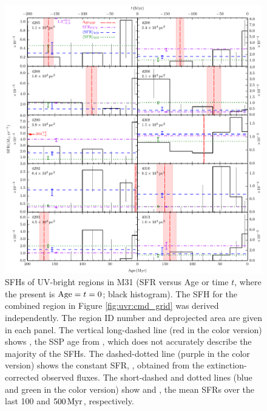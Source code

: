\begin{figure}
\centering
\includegraphics[width=\textwidth]{uv_regions-figures/sfh_grid-4285-4313.pdf}
\caption[SFHs of UV-bright regions in M31.]{SFHs of UV-bright regions in M31 (SFR versus Age or time $t$, where
    the present is $\mathrm{Age} = t = 0$; black histogram). The SFH for the
    combined region in Figure \ref{fig:uvr:cmd_grid} was derived independently. The
    region ID number and deprojected area are given in each panel. The vertical
    long-dashed line (red in the color version) shows \agessp{},
    the SSP age from \citet{Kang:2009}, which does not accurately describe the
    majority of the SFHs. The dashed-dotted line (purple in the color version) shows the
    constant SFR, \sfrfuv{}, obtained from the extinction-corrected
    observed \fuv{} fluxes. The short-dashed and dotted lines (blue and green
    in the color version) show \sfroneh{} and \sfrfiveh{}, the mean SFRs over the last 100 and
    $500\,\mathrm{Myr}$, respectively.
}
\label{fig:uvr:sfh_grid}
\end{figure}


